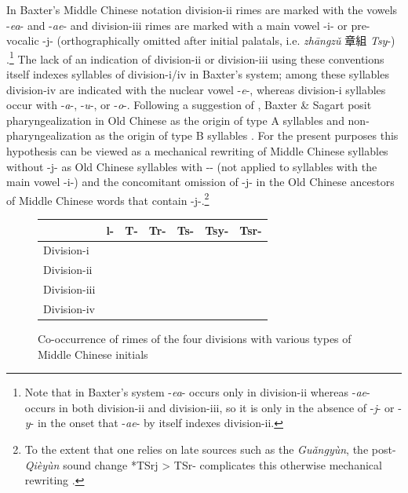 In Baxter's Middle Chinese notation division-ii rimes are marked with
the vowels -\emph{ea}- and -\emph{ae}- and division-iii rimes are marked
with a main vowel -i- or pre-vocalic -j- (orthographically omitted after
initial palatals, i.e.  \emph{zhāngzǔ} 章組  \emph{Tsy}-) 
\citep[67-75]{Baxter1992}.\footnote{Note that in Baxter's system -\emph{ea}- occurs only in
  division-ii whereas -\emph{ae}- occurs in both division-ii and
  division-iii, so it is only in the absence of -\emph{j}- or -\emph{y}-
  in the onset that -\emph{ae}- by itself indexes division-ii.} The lack
of an indication of division-ii or division-iii using these conventions
itself indexes syllables of division-i/iv in Baxter's system; among
these syllables division-iv are indicated with the nuclear vowel
-\emph{e}-, whereas division-i syllables occur with -\emph{a}-,
-\emph{u}-, or -\emph{o}-. Following a suggestion of
\citet[]{Norman1994},
Baxter \& Sagart posit pharyn­geal­iza­tion in Old Chinese as the origin
of type A syllables and non-pharyngealization as the origin of type B
syllables 
\citeyearpar[68-76]{Baxter2014OldChinese}. For the present purposes this hypothesis can be
viewed as a mechanical rewriting of Middle Chinese syllables without -j-
as Old Chinese syllables with -{}- (not applied to syllables with the
main vowel -i-) and the concomitant omission of -j- in the Old Chinese
ancestors of Middle Chinese words that contain -j-.\footnote{To the
  extent that one relies on late sources such as the  \emph{Guǎngyùn},
  the post-\emph{Qièyùn} sound change *TSrj \textgreater{} TSr-
  complicates this otherwise mechanical rewriting
  \citep[53-54]{Baxter1992}.}

\begin{figure}
    \centering
\begin{tabular}{|l|l|l|l|l|l|l|}
\hline
     &  l- & T- & Tr- & Ts- & Tsy- & Tsr- \\
\hline
Division-i & {\sil{✓}} & {\sil{✓}} && {\sil{✓}} && \\
\hline
Division-ii & & & {\sil{✓}} & & & {\sil{✓}} \\
\hline
Division-iii & {\sil{✓}} && {\sil{✓}} && {\sil{✓}} & {\sil{✓}} \\
\hline
Division-iv & {\sil{✓}} & {\sil{✓}} && {\sil{✓}} && \\
\hline
\end{tabular}
    \caption{Co-occurrence of rimes of the four divisions with various types of Middle Chinese initials}
    \label{fig:co-occurence-of-divisions}
\end{figure}

